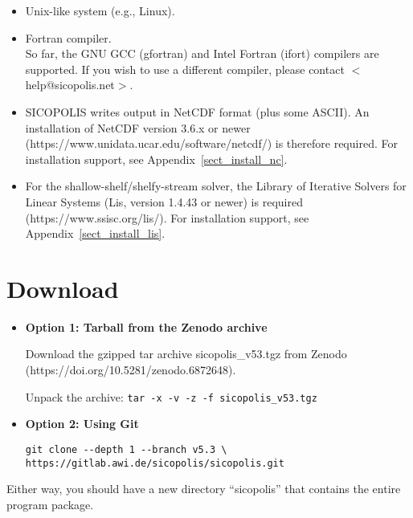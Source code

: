 \documentclass[12pt,a4paper]{article}
\begin{document}
\begin{itemize}

\item Unix-like system (e.g., Linux).

\item Fortran compiler.
\\
So far, the GNU GCC (gfortran) and Intel Fortran (ifort) compilers are supported. If you wish to use a different compiler, please contact $<$help@sicopolis.net$>$.

\item SICOPOLIS writes output in NetCDF format (plus some ASCII). An installation of NetCDF version 3.6.x or newer (https://www.unidata.ucar.edu/software/netcdf/) is therefore required. For installation support, see Appendix~\ref{sect_install_nc}.

\item For the shallow-shelf/shelfy-stream solver, the Library of Iterative Solvers for Linear Systems (Lis, version 1.4.43 or newer) is required (https://www.ssisc.org/lis/). For installation support, see Appendix~\ref{sect_install_lis}.

\end{itemize}

\section{Download}

\begin{itemize}

\item \textbf{Option 1: Tarball from the Zenodo archive}

Download the gzipped tar archive sicopolis\_v53.tgz from Zenodo
\\
(https://doi.org/10.5281/zenodo.6872648).

Unpack the archive: \verb+tar -x -v -z -f sicopolis_v53.tgz+

\item \textbf{Option 2: Using Git}

\hspace*{1.5em}\verb+git clone --depth 1 --branch v5.3 \+
\\[-1ex]
\hspace*{3.65em}\verb+https://gitlab.awi.de/sicopolis/sicopolis.git+

\end{itemize}

Either way, you should have a new directory ``sicopolis'' that contains the entire program package.
\end{document}
